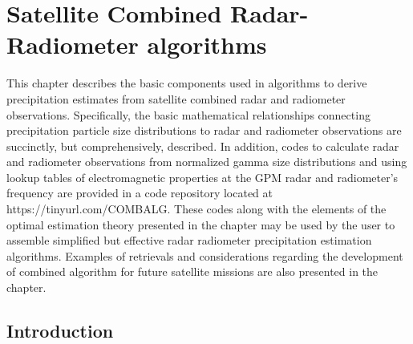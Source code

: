 \documentclass[10pt]{ietbook}
\begin{document}

\markboth{}


\chapter{Satellite Combined Radar-Radiometer algorithms}

This chapter describes the basic components used in algorithms to derive precipitation estimates from satellite combined radar and radiometer observations.
Specifically, the basic mathematical relationships connecting precipitation particle size distributions to radar and radiometer observations 
are succinctly, but comprehensively, described.  In addition, codes to calculate radar and radiometer observations from normalized gamma size 
distributions and using lookup tables of electromagnetic properties at the GPM radar and radiometer's frequency are provided in a
code repository located at https://tinyurl.com/COMBALG. These codes along with the elements of the optimal estimation theory presented in the chapter
may be used by the user to assemble simplified but effective radar radiometer precipitation estimation algorithms.  Examples of retrievals and 
considerations regarding the development of combined algorithm for future satellite missions are also presented in the chapter.


\section{Introduction}
\end{document}
